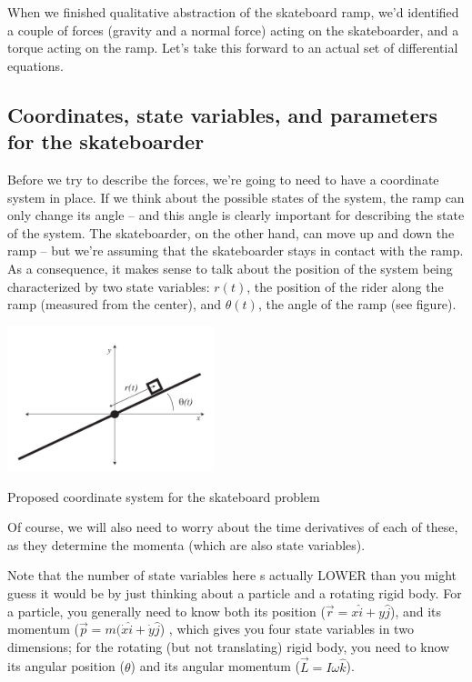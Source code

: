 \documentclass{tufte-handout}
\begin{document}
When we finished qualitative abstraction of the skateboard ramp, we'd identified a couple of forces (gravity and a normal force) acting on the skateboarder, and a torque acting on the ramp.  Let's take this forward to an actual set of differential equations.

\subsection{Coordinates, state variables, and parameters for the skateboarder}

Before we try to describe the forces, we're going to need to have a coordinate system in place. If we think about the possible states of the system, the ramp can only change its angle -- and this angle is clearly important for describing the state of the system.  The skateboarder, on the other hand, can move up and down the ramp -- but we're assuming that the skateboarder stays in contact with the ramp.  As a consequence, it makes sense to talk about the position of the system being characterized by two state variables:  $r(t)$, the position of the rider along the ramp (measured from the center), and $\theta(t)$, the angle of the ramp (see figure).
\begin{marginfigure}
\includegraphics[width=6cm]{figs/SkateboardCoords}
\caption{Proposed coordinate system for the skateboard problem}
\end{marginfigure}

Of course, we will also need to worry about the time derivatives of each of these, as they determine the momenta (which are also state variables).

Note that the number of state variables here s actually LOWER than you might guess it would be by just thinking about a particle and a rotating rigid body.  For a particle, you generally need to know both its position ($\vec{r} = x \hat{i} + y \hat{j}$), and its momentum ($\vec{p} = m(\dot{x} \hat{i} + \dot{y} \hat{j}$) , which gives you four state variables in two dimensions; for the rotating (but not translating) rigid body, you need to know its angular position ($\theta$) and its angular momentum ($\vec{L} = I \omega \hat{k}$).  
\end{document}
